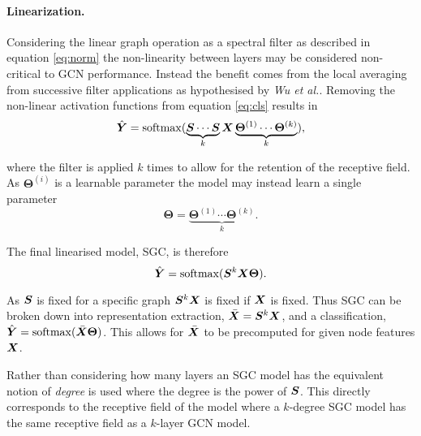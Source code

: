 \paragraph{Linearization.}
Considering the linear graph operation as a spectral filter as described in equation \ref{eq:norm} the non-linearity between layers may be considered non-critical to GCN performance.
Instead the benefit comes from the local averaging from successive filter applications as hypothesised by \textit{Wu et al.}.
Removing the non-linear activation functions from equation \ref{eq:cls} results in
\begin{equation}
    \hat{{\bm{Y}}} = \operatorname{softmax}(\underbrace{{\bm{S}}\cdots{\bm{S}}}_k{\bm{X}}\underbrace{\bm{\Theta}^{(1)}\cdots\bm{\Theta}^{(k)}}_k),
\end{equation}

where the filter is applied $k$ times to allow for the retention of the receptive field.
As $\bm{\Theta}^{(i)}$ is a learnable parameter the model may instead learn a single parameter
\begin{equation}
    \label{eq:theta}
    \bm{\Theta} = \underbrace{\bm{\Theta}^{(1)}\cdots\bm{\Theta}^{(k)}}_k.
\end{equation}

The final linearised model, SGC, is therefore
\begin{equation}
    \label{eq:SGC}
    \hat{{\bm{Y}}} = \operatorname{softmax}({\bm{S}}^{k}{\bm{X}}\bm{\Theta}).
\end{equation}

As ${\bm{S}}$ is fixed for a specific graph ${\bm{S}}^k{\bm{X}}$ is fixed if ${\bm{X}}$ is fixed.
Thus SGC can be broken down into representation extraction, $\bar{{\bm{X}}} = {\bm{S}}^k{\bm{X}}$, and a classification, $\hat{{\bm{Y}}} = \operatorname{softmax}(\bar{{\bm{X}}}\bm{\Theta})$.
This allows for $\bar{{\bm{X}}}$ to be precomputed for given node features ${\bm{X}}$.

Rather than considering how many layers an SGC model has the equivalent notion of \emph{degree} is used where the degree is the power of ${\bm{S}}$.
This directly corresponds to the receptive field of the model where a $k$-degree SGC model has the same receptive field as a $k$-layer GCN model.

